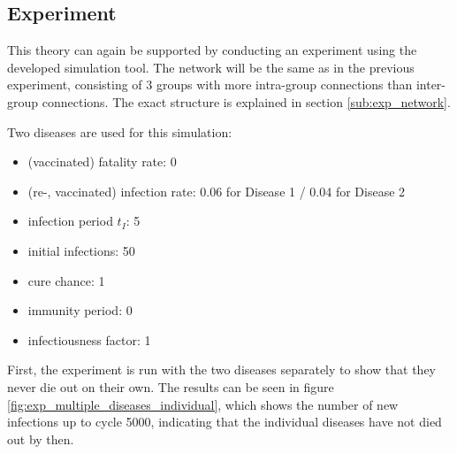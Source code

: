 \subsection{Experiment}
This theory can again be supported by conducting an experiment using the developed simulation tool. The network will be the same as in the previous experiment, consisting of 3 groups with more intra-group connections than inter-group connections. The exact structure is explained in section \ref{sub:exp_network}.

Two diseases are used for this simulation:
\begin{itemize}
    \item (vaccinated) fatality rate: 0
    \item (re-, vaccinated) infection rate: 0.06 for Disease 1 / 0.04 for Disease 2
    \item infection period $t_I$: 5
    \item initial infections: 50
    \item cure chance: 1
    \item immunity period: 0
    \item infectiousness factor: 1
\end{itemize}

First, the experiment is run with the two diseases separately to show that they never die out on their own. The results can be seen in figure \ref{fig:exp_multiple_diseases_individual}, which shows the number of new infections up to cycle 5000, indicating that the individual diseases have not died out by then.

